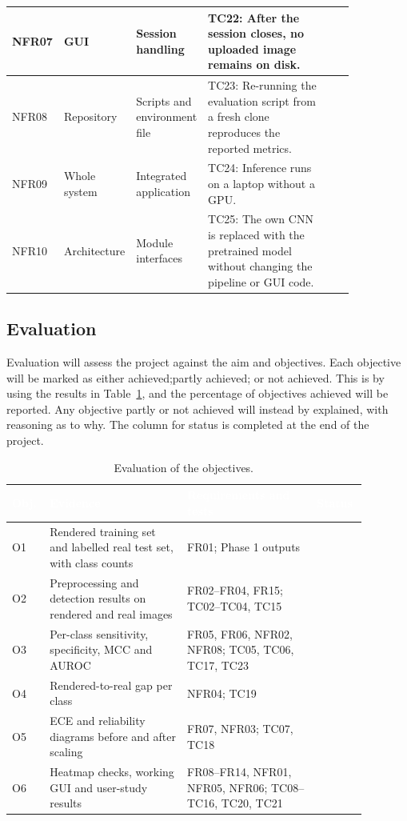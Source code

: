 \begin{table}[H]
\begin{tabular}{|p{0.07\linewidth}|p{0.15\linewidth}|p{0.16\linewidth}|p{0.39\linewidth}|p{0.08\linewidth}|}
    \hline
    NFR07 & GUI & Session handling & TC22: After the session closes, no uploaded image remains on disk. & \\
    \hline
    NFR08 & Repository & Scripts and environment file & TC23: Re-running the evaluation script from a fresh clone reproduces the reported metrics. & \\
    \hline
    NFR09 & Whole system & Integrated application & TC24: Inference runs on a laptop without a GPU. & \\
    \hline
    NFR10 & Architecture & Module interfaces & TC25: The own CNN is replaced with the pretrained model without changing the pipeline or GUI code. & \\
    \hline
  \end{tabular}
\end{table}

\subsection{Evaluation}
\label{sec:eval}

Evaluation will assess the project against the aim and objectives. Each objective will be marked as either achieved;partly achieved; or not achieved. This is by using the results in Table~\ref{tab:obj-eval}, and the percentage of objectives achieved will be reported. Any objective partly or not achieved will instead by explained, with reasoning as to why. The column for status is completed at the end of the project.

\begin{table}[H]
  \centering
  \footnotesize
  \setlength{\arrayrulewidth}{0.8pt}
  \renewcommand{\arraystretch}{1.25}
  \caption{Evaluation of the objectives.}
  \label{tab:obj-eval}
  \begin{tabular}{|p{0.07\linewidth}|p{0.36\linewidth}|p{0.34\linewidth}|p{0.11\linewidth}|}
    \hline
    \rowcolor{cyan!90!black}
    \textcolor{white}{\textbf{Obj.}} & \textcolor{white}{\textbf{Evidence}} &
    \textcolor{white}{\textbf{Requirements and tests}} & \textcolor{white}{\textbf{Status}} \\
    \hline
    O1 & Rendered training set and labelled real test set, with class counts & FR01; Phase 1 outputs & \\
    \hline
    O2 & Preprocessing and detection results on rendered and real images & FR02--FR04, FR15; TC02--TC04, TC15 & \\
    \hline
    O3 & Per-class sensitivity, specificity, MCC and AUROC & FR05, FR06, NFR02, NFR08; TC05, TC06, TC17, TC23 & \\
    \hline
    O4 & Rendered-to-real gap per class & NFR04; TC19 & \\
    \hline
    O5 & ECE and reliability diagrams before and after scaling & FR07, NFR03; TC07, TC18 & \\
    \hline
    O6 & Heatmap checks, working GUI and user-study results & FR08--FR14, NFR01, NFR05, NFR06; TC08--TC16, TC20, TC21 & \\
    \hline
  \end{tabular}
\end{table}


